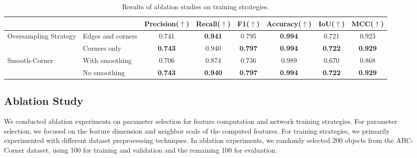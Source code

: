 \documentclass[lettersize,journal]{IEEEtran}
\begin{document}
\begin{table}[ht]
    \centering
    \small
    \setlength{\tabcolsep}{10pt}
    \caption{Results of ablation studies on training strategies.}
    \label{tab:additional_ablation_study}
    \begin{tabular}{llcccccc}
            \toprule
            & & Precision($\uparrow$) & Recall($\uparrow$) & F1($\uparrow$)& Accuracy($\uparrow$)& IoU($\uparrow$)& MCC($\uparrow$)\\
            \midrule
    
            \multirow{2}{*}{Oversampling Strategy}
            & Edges and corners & 0.741& \textbf{0.941}& 0.795& \textbf{0.994}& 0.721& 0.923\\
            & Corners only & \textbf{0.743}& 0.940& \textbf{0.797}& \textbf{0.994}& \textbf{0.722}& \textbf{0.929}\\
            
            \midrule
            
            \multirow{2}{*}{Smooth-Corner}
            & With smoothing & 0.706& 0.874& 0.736& 0.989& 0.670& 0.868\\
            & No smoothing & \textbf{0.743}& \textbf{0.940}& \textbf{0.797}& \textbf{0.994}& \textbf{0.722}& \textbf{0.929}\\

            
            \bottomrule
        \end{tabular}
        
        
\end{table}

\subsection{Ablation Study}
\label{sec:ablation_study}

We conducted ablation experiments on parameter selection for feature computation and network training strategies. For parameter selection, we focused on the feature dimension and neighbor scale of the computed features. For training strategies, we primarily experimented with different dataset preprocessing techniques. In ablation experiments, we randomly selected 200 objects from the ABC-Corner dataset, using 100 for training and validation and the remaining 100 for evaluation.
\end{document}
